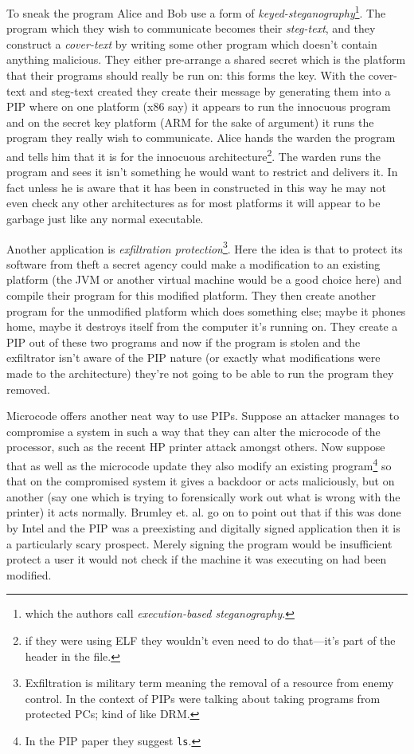 \documentclass[]{book}
\begin{document}
To sneak the program Alice and Bob use a form of
\emph{keyed-steganography}\footnote{which the
  authors\autocite{Cha:2010uh} call \emph{execution-based
  steganography}.}. The program which they wish to communicate becomes
their \emph{steg-text}, and they construct a \emph{cover-text} by
writing some other program which doesn't contain anything malicious.
They either pre-arrange a shared secret which is the platform that their
programs should really be run on: this forms the key. With the
cover-text and steg-text created they create their message by generating
them into a PIP where on one platform (x86 say) it appears to run the
innocuous program and on the secret key platform (ARM for the sake of
argument) it runs the program they really wish to communicate. Alice
hands the warden the program and tells him that it is for the innocuous
architecture\footnote{if they were using ELF they wouldn't even need to
  do that---it's part of the header in the file\autocite{mancx:th}.}.
The warden runs the program and sees it isn't something he would want to
restrict and delivers it. In fact unless he is aware that it has been in
constructed in this way he may not even check any other architectures as
for most platforms it will appear to be garbage just like any normal
executable.

Another application is \emph{exfiltration protection}\footnote{Exfiltration
  is military term meaning the removal of a resource from enemy control.
  In the context of PIPs were talking about taking programs from
  protected PCs; kind of like DRM.}. Here the idea is that to protect
its software from theft a secret agency could make a modification to an
existing platform (the JVM or another virtual machine would be a good
choice here) and compile their program for this modified platform. They
then create another program for the unmodified platform which does
something else; maybe it phones home, maybe it destroys itself from the
computer it's running on. They create a PIP out of these two programs
and now if the program is stolen and the exfiltrator isn't aware of the
PIP nature (or exactly what modifications were made to the architecture)
they're not going to be able to run the program they removed.

Microcode offers another neat way to use PIPs. Suppose an attacker
manages to compromise a system in such a way that they can alter the
microcode of the processor, such as the recent HP printer attack amongst
others\autocite{Cui:vx}\autocite{Scythale:tk}. Now suppose that as well
as the microcode update they also modify an existing program\footnote{In
  the PIP paper\autocite{Cha:2010uh} they suggest \lstinline!ls!.} so
that on the compromised system it gives a backdoor or acts maliciously,
but on another (say one which is trying to forensically work out what is
wrong with the printer) it acts normally. Brumley et. al. go on to point
out\autocite{Cha:2010uh} that if this was done by Intel and the PIP was
a preexisting and digitally signed application then it is a particularly
scary prospect. Merely signing the program would be insufficient protect
a user it would not check if the machine it was executing on had been
modified.
\end{document}
